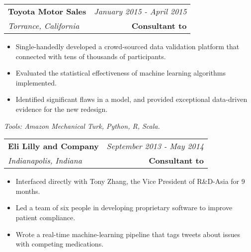 \documentclass[10pt,a4paper]{article}
\begin{document}
  \vspace*{3mm}\noindent\begin{tabularx}{17cm}{X r}
    \textbf{Toyota Motor Sales} & \textit{January 2015 - April 2015} \\
    \textit{Torrance, California} & \textbf{Consultant to} \\
  \end{tabularx}

  \vspace*{1mm}\noindent\begin{minipage}{17cm}
    \begin{itemize}[leftmargin=6mm,topsep=0mm,itemsep=-1mm]
      \item Single-handedly developed a crowd-sourced data validation platform that connected with tens of thousands of participants. 
      \item Evaluated the statistical effectiveness of machine learning algorithms implemented.
      \item Identified significant flaws in a model, and provided exceptional data-driven evidence for the new redesign.
    \end{itemize}
  \end{minipage}

  \vspace*{2mm}\setlength\parindent{2mm}\begin{minipage}{16.8cm}
    \textit{Tools: Amazon Mechanical Turk, Python, R, Scala.}
  \end{minipage}

  \vspace*{3mm}\noindent\begin{tabularx}{17cm}{X r}
    \textbf{Eli Lilly and Company} & \textit{September 2013 - May 2014} \\
    \textit{Indianapolis, Indiana} & \textbf{Consultant to} 
  \end{tabularx}

  \vspace*{1mm}\noindent\begin{minipage}{17cm}
    \begin{itemize}[leftmargin=6mm,topsep=0mm,itemsep=-1mm]
      \item Interfaced directly with Tony Zhang, the Vice President of R\&D-Asia for 9 months.
      \item Led a team of six people in developing proprietary software to improve patient compliance.
      \item Wrote a real-time machine-learning pipeline that tags tweets about issues with competing medications.
    \end{itemize}
  \end{minipage}
\end{document}
